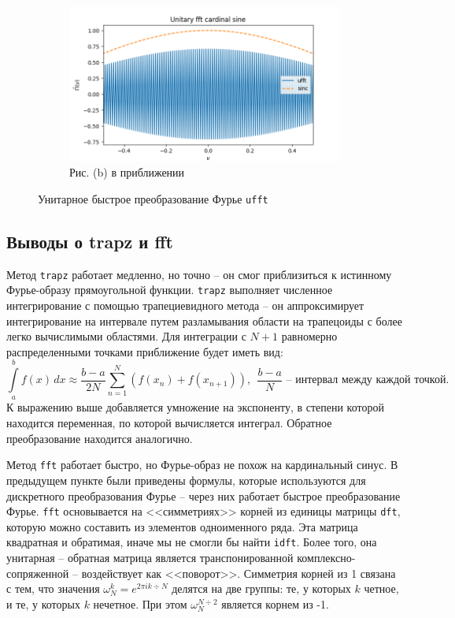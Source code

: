 \documentclass[a4paper, 12pt]{article}
\begin{document}
\begin{figure}[H]
\begin{subfigure}{0.45\textwidth}
            \centering
            \includegraphics[width=\linewidth]{ufft_close.png}
            \caption{Рис. (b) в приближении}
            \label{fig:ufftc}
        \end{subfigure}
        \caption{Унитарное быстрое преобразование Фурье \texttt{ufft}}
        \label{fig:uffts}
    \end{figure}


    \subsection{Выводы о trapz и fft}
    Метод \texttt{trapz} работает медленно, но точно -- он смог приблизиться к истинному Фурье-образу прямоугольной функции.
    \texttt{trapz} выполняет численное интегрирование с помощью трапециевидного метода -- он аппроксимирует интегрирование
    на интервале путем разламывания области на трапецоиды с более легко вычислимыми областями. Для интеграции с $N+1$
    равномерно распределенными точками приближение будет иметь вид:
    $$
    \int\limits_{a}^{b}f(x)\,dx\approx\dfrac{b-a}{2N}\sum\limits_{n=1}^{N}\left(f(x_n)+f(x_{n+1})\right), \ \ \dfrac{b-a}{N} \text{ -- интервал между каждой точкой.}
    $$
    К выражению выше добавляется умножение на экспоненту, в степени которой находится переменная, по которой вычисляется интеграл.
    Обратное преобразование находится аналогично.


    Метод \texttt{fft} работает быстро, но Фурье-образ не похож на кардинальный синус. В предыдущем пункте были приведены
    формулы, которые используются для дискретного преобразования Фурье -- через них работает быстрое преобразование Фурье.
    \texttt{fft} основывается на <<симметриях>> корней из единицы матрицы \texttt{dft}, которую можно составить из элементов
    одноименного ряда. Эта матрица квадратная и обратимая, иначе мы не смогли бы найти \texttt{idft}. Более того, она
    унитарная -- обратная матрица является транспонированной комплексно-сопряженной -- воздействует как <<поворот>>.
    Симметрия корней из 1 связана с тем, что значения $\omega_{N}^k=e^{2\pi i k\div N}$ делятся на две группы:
    те, у которых $k$ четное, и те, у которых $k$ нечетное. При этом $\omega_{N}^{N\div2}$ является корнем из -1.
\end{document}
